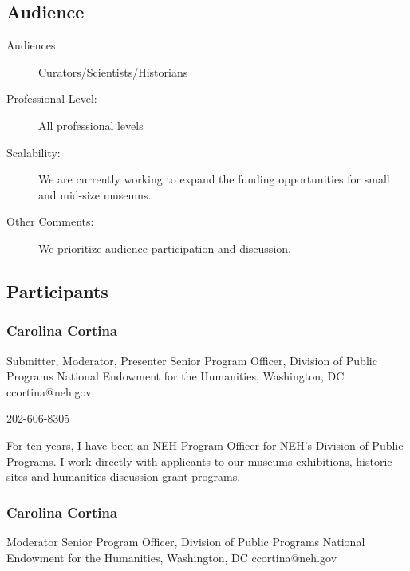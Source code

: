 \documentclass{report}
\begin{document}
              \subsection*{Audience}
                \begin{description}
                  \item [Audiences:]Curators/Scientists/Historians~
                  \item[Professional Level:]All professional levels~
                \item[Scalability:] We are currently working to expand the funding opportunities for small and mid-size museums.

							
              \item[Other Comments:] We prioritize audience participation and discussion.
              \end{description}
            \subsection*{Participants}
              \subsubsection*{ Carolina Cortina }
              Submitter, Moderator, Presenter\newline
              Senior Program Officer, Division of Public Programs\newline
              National Endowment for the Humanities, Washington, DC
              \newline
              ccortina@neh.gov\newline
              
              202-606-8305\newline

              For ten years, I have been an NEH Program Officer for NEH's Division of Public Programs. I work directly with applicants to our museums exhibitions, historic sites and humanities discussion grant programs.\newline


              
                \subsubsection*{ Carolina Cortina }
                Moderator\newline
                Senior Program Officer, Division of Public Programs\newline
                National Endowment for the Humanities, Washington, DC
                \newline
                ccortina@neh.gov\newline
                
\end{document}
